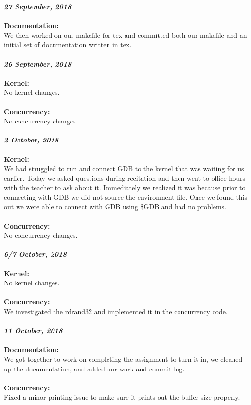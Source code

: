 \documentclass[10pt,a4paper,english]{article}
\begin{document}
\noindent
\textit{\textbf{27 September, 2018}} \\\\
\textbf{Documentation:} \\
\indent We then worked on our makefile for tex and committed both our makefile and an initial set of documentation written in tex.
\\\\

\noindent
\textit{\textbf{26 September, 2018}} \\\\
\textbf{Kernel:} \\
\indent No kernel changes.
\\\\
\textbf{Concurrency:} \\
\indent No concurrency changes.
\\\\

\noindent
\textit{\textbf{2 October, 2018}} \\\\
\textbf{Kernel:} \\
\indent We had struggled to run and connect GDB to the kernel that was waiting for us earlier. Today we asked questions during recitation and then went to office hours with the teacher to ask about it. Immediately we realized it was because prior to connecting with GDB we did not source the environment file. Once we found this out we were able to connect with GDB using \$GDB and had no problems.
\\\\
\textbf{Concurrency:} \\
\indent No concurrency changes.
\\\\

\noindent
\textit{\textbf{6/7 October, 2018}} \\\\
\textbf{Kernel:} \\
\indent No kernel changes.
\\\\
\textbf{Concurrency:} \\
\indent We investigated the rdrand32 and implemented it in the concurrency code.
\\\\

\noindent
\textit{\textbf{11 October, 2018}} \\\\
\textbf{Documentation:} \\
\indent We got together to work on completing the assignment to turn it in, we cleaned up the documentation, and added our work and commit log.
\\\\
\textbf{Concurrency:} \\
\indent Fixed a minor printing issue to make sure it prints out the buffer size properly.
\\\\

\end{document}
